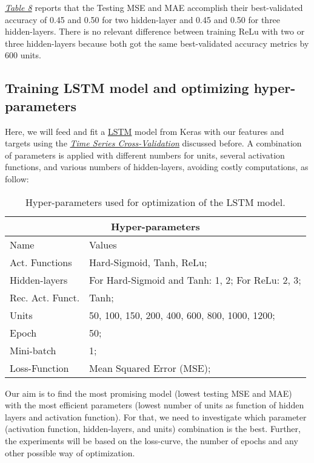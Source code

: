 \hyperref[table:Results for RNN, ReLu, Low]{\textit{Table 8}} reports that the Testing MSE and MAE accomplish their best-validated accuracy of 0.45 and 0.50 for two hidden-layer and 0.45 and 0.50 for three hidden-layers. There is no relevant difference between training ReLu with two or three hidden-layers because both got the same best-validated accuracy metrics by 600 units.\\

\subsection{Training LSTM model and optimizing hyper-parameters}
\label{chap:Training LSTM model and optimizing hyper-parameters}

\quad Here, we will feed and fit a \href{https://www.tensorflow.org/api_docs/python/tf/keras/layers/LSTMN}{LSTM} model from Keras with our features and targets using the \hyperref[chap:Time series Cross-Validation]{\textit{Time Series Cross-Validation}} discussed before. A combination of parameters is applied with different numbers for units, several activation functions, and various numbers of hidden-layers, avoiding costly computations, as follow:

\begin{table}[H]
\centering
\begin{tabular}{ |p{2.75cm}||p{8cm}|  }
\hline
\multicolumn{2}{|c|}{Hyper-parameters} \\
\hline
Name & Values\\
\hline
Act. Functions & Hard-Sigmoid, Tanh, ReLu;\\
Hidden-layers & For Hard-Sigmoid and Tanh: 1, 2; For ReLu: 2, 3;\\
Rec. Act. Funct. & Tanh;\\
Units & 50, 100, 150, 200, 400, 600, 800, 1000, 1200;\\
Epoch & 50;\\
Mini-batch & 1;\\
Loss-Function & Mean Squared Error (MSE);\\
\hline
\end{tabular}
\label{table:Hyper-parameters for LSTM}
\caption{Hyper-parameters used for optimization of the LSTM model.}
\end{table}

Our aim is to find the most promising model (lowest testing MSE and MAE) with the most efficient parameters (lowest number of units as function of hidden layers and activation function). For that, we need to investigate which parameter (activation function, hidden-layers, and units) combination is the best. Further, the experiments will be based on the loss-curve, the number of epochs and any other possible way of optimization.\\

